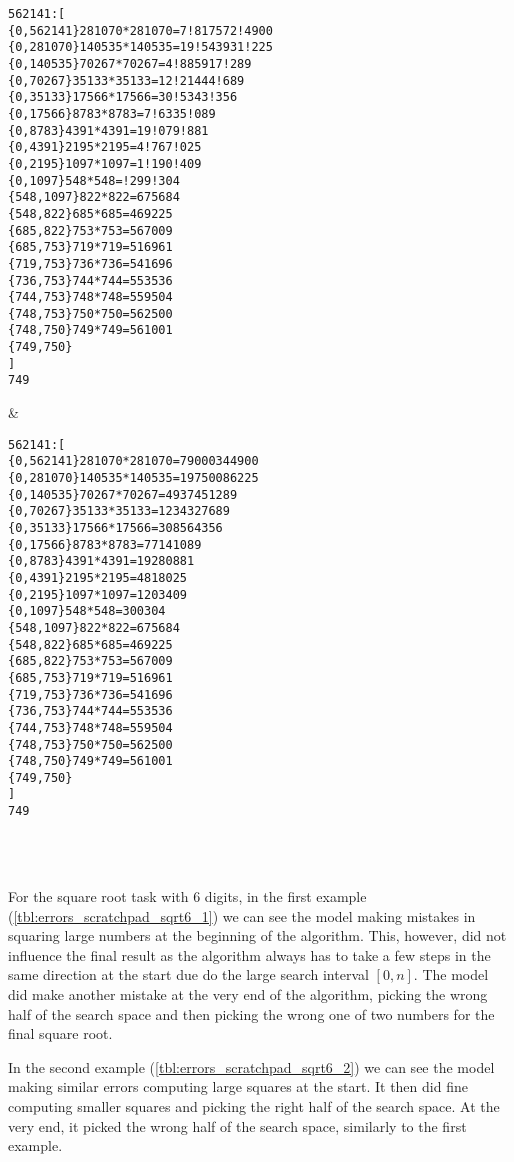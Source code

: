 \ErrorAnalysisTableBegin
\begin{lstlisting}
562141:[
{0,562141}281070*281070=7!817572!4900
{0,281070}140535*140535=19!543931!225
{0,140535}70267*70267=4!885917!289
{0,70267}35133*35133=12!21444!689
{0,35133}17566*17566=30!5343!356
{0,17566}8783*8783=7!6335!089
{0,8783}4391*4391=19!079!881
{0,4391}2195*2195=4!767!025
{0,2195}1097*1097=1!190!409
{0,1097}548*548=!299!304
{548,1097}822*822=675684
{548,822}685*685=469225
{685,822}753*753=567009
{685,753}719*719=516961
{719,753}736*736=541696
{736,753}744*744=553536
{744,753}748*748=559504
{748,753}750*750=562500
{748,750}749*749=561001
{749,750}
]
749
\end{lstlisting} &
\begin{lstlisting}
562141:[
{0,562141}281070*281070=79000344900
{0,281070}140535*140535=19750086225
{0,140535}70267*70267=4937451289
{0,70267}35133*35133=1234327689
{0,35133}17566*17566=308564356
{0,17566}8783*8783=77141089
{0,8783}4391*4391=19280881
{0,4391}2195*2195=4818025
{0,2195}1097*1097=1203409
{0,1097}548*548=300304
{548,1097}822*822=675684
{548,822}685*685=469225
{685,822}753*753=567009
{685,753}719*719=516961
{719,753}736*736=541696
{736,753}744*744=553536
{744,753}748*748=559504
{748,753}750*750=562500
{748,750}749*749=561001
{749,750}
]
749
\end{lstlisting} \\
\\

For the square root task with 6 digits, in the first example (\cref{tbl:errors_scratchpad_sqrt6_1}) we can see the model making mistakes in squaring large numbers at the beginning of the algorithm. This, however, did not influence the final result as the algorithm always has to take a few steps in the same direction at the start due do the large search interval $[0, n]$.
The model did make another mistake at the very end of the algorithm, picking the wrong half of the search space and then picking the wrong one of two numbers for the final square root.

In the second example (\cref{tbl:errors_scratchpad_sqrt6_2}) we can see the model making similar errors computing large squares at the start. It then did fine computing smaller squares and picking the right half of the search space. At the very end, it picked the wrong half of the search space, similarly to the first example.

